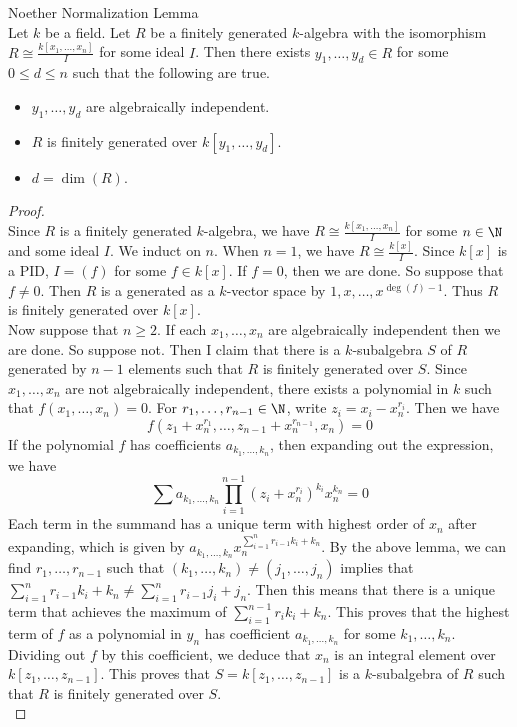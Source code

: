 \documentclass[a4paper]{article}
\begin{document}
\begin{thm}{Noether Normalization Lemma}{}\\
Let $k$ be a field. Let $R$ be a finitely generated $k$-algebra with the isomorphism $R\cong\frac{k[x_1,\dots,x_n]}{I}$ for some ideal $I$. Then there exists $y_1,\dots,y_d\in R$ for some $0\leq d\leq n$ such that the following are true. 
\begin{itemize}
\item $y_1,\dots,y_d$ are algebraically independent. 
\item $R$ is finitely generated over $k[y_1,\dots,y_d]$. 
\item $d=\dim(R)$. 
\end{itemize}
\begin{proof}\\
Since $R$ is a finitely generated $k$-algebra, we have $R\cong\frac{k[x_1,\dots,x_n]}{I}$ for some $n\in\N$ and some ideal $I$. We induct on $n$. When $n=1$, we have $R\cong\frac{k[x]}{I}$. Since $k[x]$ is a PID, $I=(f)$ for some $f\in k[x]$. If $f=0$, then we are done. So suppose that $f\neq 0$. Then $R$ is a generated as a $k$-vector space by $1,x,\dots,x^{\deg(f)-1}$. Thus $R$ is finitely generated over $k[x]$. \\

Now suppose that $n\geq 2$. If each $x_1,\dots,x_n$ are algebraically independent then we are done. So suppose not. Then I claim that there is a $k$-subalgebra $S$ of $R$ generated by $n-1$ elements such that $R$ is finitely generated over $S$. Since $x_1,\dots,x_n$ are not algebraically independent, there exists a polynomial in $k$ such that $f(x_1,\dots,x_n)=0$. For $r_1,\dots,r_{n-1}\in\N$, write $z_i=x_i-x_n^{r_i}$. Then we have $$f(z_1+x_n^{r_1},\dots,z_{n-1}+x_n^{r_{n-1}},x_n)=0$$ If the polynomial $f$ has coefficients $a_{k_1,\dots,k_n}$, then expanding out the expression, we have $$\sum a_{k_1,\dots,k_n}\prod_{i=1}^{n-1}(z_i+x_n^{r_i})^{k_i}x_n^{k_n}=0$$ Each term in the summand has a unique term with highest order of $x_n$ after expanding, which is given by $a_{k_1,\dots,k_n}x_n^{\sum_{i=1}^nr_{i-1}k_i+k_n}$. By the above lemma, we can find $r_1,\dots,r_{n-1}$ such that $(k_1,\dots,k_n)\neq(j_1,\dots,j_n)$ implies that $\sum_{i=1}^nr_{i-1}k_i+k_n\neq\sum_{i=1}^nr_{i-1}j_i+j_n$. Then this means that there is a unique term that achieves the maximum of $\sum_{i=1}^{n-1}r_ik_i+k_n$. This proves that the highest term of $f$ as a polynomial in $y_n$ has coefficient $a_{k_1,\dots,k_n}$ for some $k_1,\dots,k_n$. Dividing out $f$ by this coefficient, we deduce that $x_n$ is an integral element over $k[z_1,\dots,z_{n-1}]$. This proves that $S=k[z_1,\dots,z_{n-1}]$ is a $k$-subalgebra of $R$ such that $R$ is finitely generated over $S$. \\


\end{proof}
\end{thm}
\end{document}
